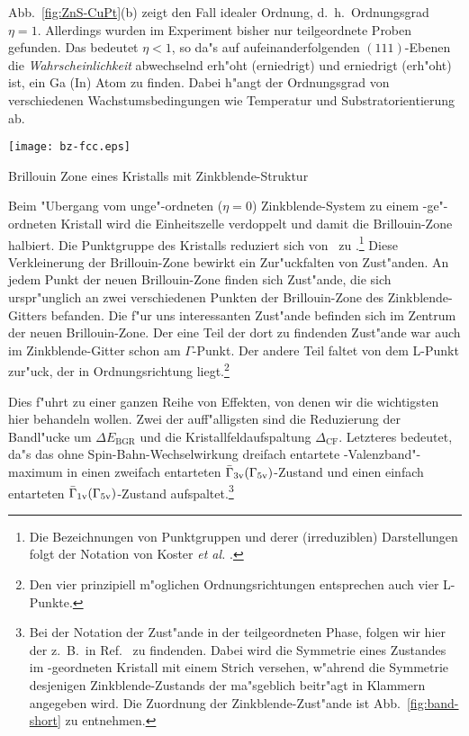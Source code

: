 Abb.~\ref{fig:ZnS-CuPt}(b) zeigt den Fall idealer Ordnung, d.~h.\
Ordnungsgrad $\eta=1$. Allerdings wurden im Experiment bisher nur teilgeordnete
Proben gefunden. Das bedeutet $\eta < 1$, so da"s auf  aufeinanderfolgenden
$(111)$-Ebenen die \emph{Wahrscheinlichkeit} abwechselnd erh"oht (erniedrigt)
und erniedrigt (erh"oht) ist, ein Ga (In) Atom zu finden. Dabei h"angt der
Ordnungsgrad von verschiedenen Wachstumsbedingungen wie Temperatur und
Substratorientierung ab.



\begin{floatingfigure}{75mm}
  \texttt{[image: bz-fcc.eps]}
  \caption{Brillouin Zone eines Kristalls mit Zinkblende-Struktur}
  \label{fig:bz-fcc}
\end{floatingfigure}


\sloppy 
Beim "Ubergang vom unge"-ordneten ($\eta=0$) Zinkblende-System zu einem
\CuPt-ge"-ordneten Kristall wird die Einheitszelle verdoppelt und damit die
Brillouin-Zone halbiert. Die Punktgruppe des Kristalls reduziert sich von \Td\ 
zu \Cdv.\footnote{Die Bezeichnungen von Punktgruppen und derer (irreduziblen)
  Darstellungen folgt der Notation von Koster \emph{et al.}  \cite{kdws:63}.}
Diese Verkleinerung der Brillouin-Zone bewirkt ein Zur"uckfalten von
Zust"anden. An jedem Punkt der neuen Brillouin-Zone finden sich Zust"ande, die
sich urspr"unglich an zwei verschiedenen Punkten der Brillouin-Zone des
Zinkblende-Gitters befanden. Die f"ur uns interessanten Zust"ande befinden
sich im Zentrum der neuen Brillouin-Zone.  Der eine Teil der dort zu findenden
Zust"ande war auch im Zinkblende-Gitter schon am $\Gamma$-Punkt. Der andere
Teil faltet von dem L-Punkt zur"uck, der in Ordnungsrichtung
liegt.\footnote{Den vier prinzipiell m"oglichen Ordnungsrichtungen entsprechen
  auch vier L-Punkte.}

\fussy

Dies f"uhrt zu einer ganzen Reihe von Effekten, von denen wir die wichtigsten
hier behandeln wollen. Zwei der auff"alligsten  
sind die Reduzierung der Bandl"ucke um $\Delta E_{\text{BGR}}$ und die
Kristallfeldaufspaltung $\Delta_{\text{CF}}$. Letzteres bedeutet, da"s das ohne
Spin-Bahn-Wechselwirkung dreifach entartete \GVB-Valenzband"-maximum in einen
zweifach entarteten $\protect\bar \Gamma_{3 \text{v}} (\Gamma_{5 \text{v}})$-Zustand und einen einfach entarteten
$\protect\bar \Gamma_{1 \text{v}} (\Gamma_{5 \text{v}})$-Zustand aufspaltet.\footnote{Bei der Notation der Zust"ande
  in der teilgeordneten Phase, folgen wir hier der z.~B.\ in
  Ref.~\cite{wfz:95} zu findenden. Dabei wird die Symmetrie eines Zustandes im
  \CuPt-geordneten Kristall mit einem Strich versehen, w"ahrend die Symmetrie
  desjenigen Zinkblende-Zustands der ma"sgeblich beitr"agt in Klammern
  angegeben wird. Die Zuordnung der Zinkblende-Zust"ande ist
  Abb.~\ref{fig:band-short} zu entnehmen.}

